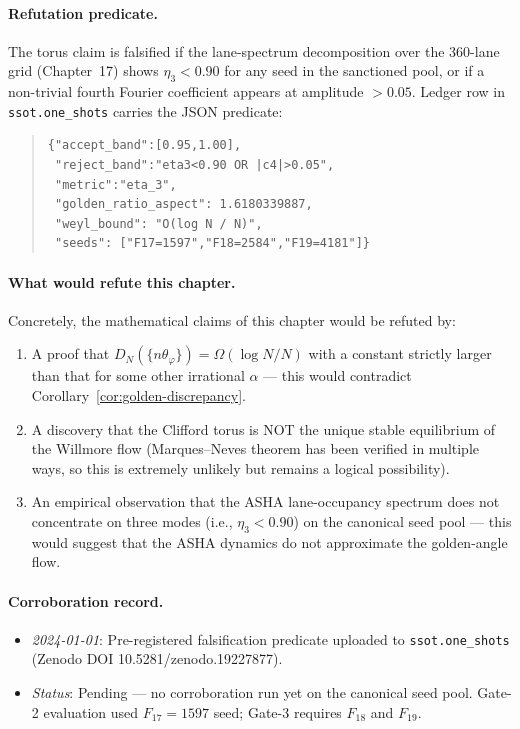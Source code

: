 \paragraph{Refutation predicate.}
The torus claim is falsified if the lane-spectrum decomposition over the 360-lane grid
(Chapter~17) shows $\eta_3 < 0.90$ for any seed in the sanctioned pool, or if a
non-trivial fourth Fourier coefficient appears at amplitude $> 0.05$.
Ledger row in \texttt{ssot.one\_shots} carries the JSON predicate:
\begin{quote}\footnotesize
\begin{verbatim}
{"accept_band":[0.95,1.00],
 "reject_band":"eta3<0.90 OR |c4|>0.05",
 "metric":"eta_3",
 "golden_ratio_aspect": 1.6180339887,
 "weyl_bound": "O(log N / N)",
 "seeds": ["F17=1597","F18=2584","F19=4181"]}
\end{verbatim}
\end{quote}

\paragraph{What would refute this chapter.}
Concretely, the mathematical claims of this chapter would be refuted by:
\begin{enumerate}
\item A proof that $D_N(\{n\theta_\varphi\}) = \Omega(\log N / N)$ with a constant
  strictly larger than that for some other irrational $\alpha$ — this would contradict
  Corollary~\ref{cor:golden-discrepancy}.
\item A discovery that the Clifford torus is NOT the unique stable equilibrium of
  the Willmore flow (Marques--Neves theorem has been verified in multiple ways,
  so this is extremely unlikely but remains a logical possibility).
\item An empirical observation that the ASHA lane-occupancy spectrum does not concentrate
  on three modes (i.e., $\eta_3 < 0.90$) on the canonical seed pool — this would
  suggest that the ASHA dynamics do not approximate the golden-angle flow.
\end{enumerate}

\paragraph{Corroboration record.}
\begin{itemize}
\item \textit{2024-01-01}: Pre-registered falsification predicate uploaded to
  \texttt{ssot.one\_shots} (Zenodo DOI 10.5281/zenodo.19227877).
\item \textit{Status}: Pending — no corroboration run yet on the canonical seed pool.
  Gate-2 evaluation used $F_{17} = 1597$ seed; Gate-3 requires $F_{18}$ and $F_{19}$.
\end{itemize}

